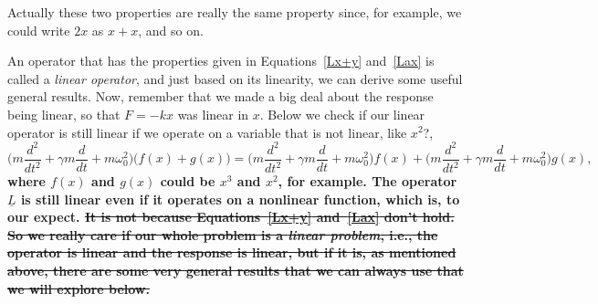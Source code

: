 \documentclass[]{revtex4}
\newcommand{\st}[1]{{\color{red}\bfseries #1}}
\begin{document}
Actually these two properties are really the same property since, for example, we could
write $2x$ as $x+x$, and so on.

An operator that has the properties given in Equations~\ref{Lx+y} and~\ref{Lax} is called
a {\it linear operator}, and just based on its linearity, we can derive some useful general results.
Now, remember that we made a big deal about the response being linear, so that $F=-kx$ was linear
in $x$.  Below we check if our linear operator is still linear if we operate on a variable that is not linear, like $x^2$?,
\st{
  \begin{equation}
    \bigg( m\frac{ d^2 }{ dt^2 } + \gamma m \frac{ d }{ dt } + m \omega_0^2 \bigg)
    \big( f(x) + g(x) \big)
    = \bigg( m\frac{ d^2 }{ dt^2 } + \gamma m \frac{ d }{ dt } + m \omega_0^2 \bigg) f(x) 
    + \bigg( m\frac{ d^2 }{ dt^2 } + \gamma m \frac{ d }{ dt } + m \omega_0^2 \bigg) g(x),
  \end{equation}
  where $f(x)$ and $g(x)$ could be $x^3$ and $x^2$, for example.
  The operator $\underline{L}$ is still linear even if it operates on a nonlinear function,
  which is, to our expect.
  \sout{It is not because Equations~\ref{Lx+y} and~\ref{Lax} don't hold.  So we really care if our whole problem is a {\it linear
        problem}, i.e., the operator is linear and the response is linear, but if it is, as mentioned above, there are some
    very general results that we can always use that we will explore below.}
}
\end{document}
